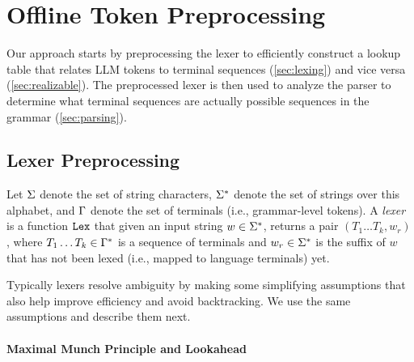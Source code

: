 \section{Offline Token Preprocessing}
\label{sec:offline}

% 
Our approach starts by preprocessing the lexer to efficiently construct a lookup table that relates LLM tokens to terminal sequences (\autoref{sec:lexing}) and vice versa (\autoref{sec:realizable}). 
The preprocessed lexer is then used to analyze the parser to determine what terminal sequences are actually possible sequences in the grammar (\autoref{sec:parsing}).


\subsection{Lexer Preprocessing }
\label{sec:lexing}

Let $\Sigma$ denote the set of string characters, $\Sigma^\ast$ denote the set of strings over this alphabet, and $\Gamma$ denote the set of terminals (i.e., grammar-level tokens).
A \emph{lexer} is a function $\mathtt{Lex}$ that given an input string $w \in \Sigma^\ast$, returns a pair $(T_1\ldots T_k, w_r)$, where $T_1 \ldots T_k \in \Gamma^\ast$ is a sequence of terminals and $w_r \in \Sigma^\ast$ is the suffix of $w$ that has not been lexed (i.e., mapped to language terminals) yet. 

Typically lexers resolve ambiguity by making some simplifying assumptions that also help improve efficiency and avoid backtracking.
We use the same assumptions and describe them next.


\paragraph{Maximal Munch Principle and Lookahead}

